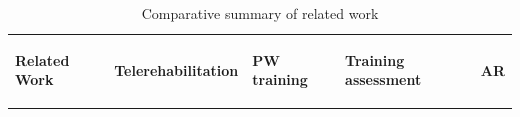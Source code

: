 \begin{table}[!hbt]
\centering
\caption{Comparative summary of related work}
\begin{tabular}{ >{\centering}m{8cm} | >{\centering}m{1cm} | >{\centering}m{1cm} | >{\centering}m{1.1cm} | >{\centering}m{1cm} }
\hline
\cellcolor[gray]{0.9} \textbf{Related Work} & 
\cellcolor[gray]{0.9} \begin{sideways} \textbf{Telerehabilitation} { }\end{sideways}&
\cellcolor[gray]{0.9} \begin{sideways} \textbf{PW training} \end{sideways}&
\cellcolor[gray]{0.9} \begin{sideways} \parbox{4.5cm}{\textbf{\hspace{5pt}Training assessment}}{ } \end{sideways}& 
\cellcolor[gray]{0.9} \begin{sideways} \textbf{\hspace{-20pt}AR} \end{sideways}


\end{tabular}
\end{table}
